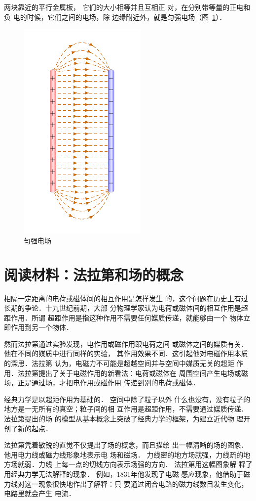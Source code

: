 两块靠近的平行金属板，
它们的大小相等并且互相正
对，在分别带等量的正电和负
电的时候，它们之间的电场，除
边缘附近外，就是匀强电场（图~\ref{fig_B_6-11}）．

\begin{figure}[htbp]
    \centering
    \includegraphics{fig/B/6-11.pdf}
    \caption{匀强电场}\label{fig_B_6-11}
\end{figure}

\section*{阅读材料：法拉第和场的概念}
相隔一定距离的电荷或磁体间的相互作用是怎样发生
的，这个问题在历史上有过长期的争论．十九世纪前期，大部
分物理学家认为电荷或磁体间的相互作用是超距作用．所谓
超距作用是指这种作用不需要任何媒质传递，就能够由一个
物体立即作用到另一个物体．

然而法拉第通过实验发现，电作用或磁作用跟电荷之间
或磁体之间的媒质有关．他在不同的媒质中进行同样的实验，
其作用效果不同．这引起他对电磁作用本质的深思．法拉第
认为，电磁力不可能是超越空间并与空间中媒质无关的超距
作用．法拉第提出了关于电磁作用的新看法：电荷或磁体在
周围空间产生电场或磁场，正是通过场，才把电作用或磁作用
传递到别的电荷或磁体．

经典力学是以超距作用为基础的．
空间中除了粒子以外
什么也没有，没有粒子的地方是一无所有的真空；粒子间的相
互作用是超距作用，不需要通过媒质传递．法拉第提出的场
的模型从基本概念上突破了经典力学的框架，为建立近代物
理开创了新的起点．

法拉第凭着敏锐的直觉不仅提出了场的概念，而且描绘
出一幅清晰的场的图象．他用电力线或磁力线形象地表示电
场和磁场．
力线密的地方场就强，力线疏的地方场就弱．力线
上每一点的切线方向表示场强的方向．
法拉第用这幅图象解
释了用经典力学无法解释的现象．
例如，1831年他发现了电磁
感应现象，他借助于磁力线对这一现象很快地作出了解释：只
要通过闭合电路的磁力线数目发生变化，电路里就会产生
电流．

